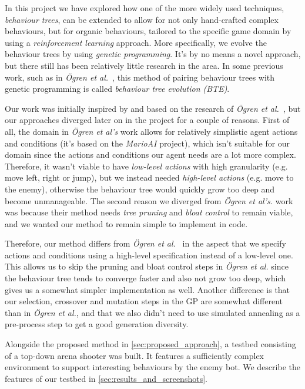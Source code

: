 \documentclass[a4paper, twocolumn]{article}
\begin{document}
    In this project we have explored how one of the more widely used techniques, \emph{behaviour trees}, can be extended to allow for not only hand-crafted complex behaviours, but for organic behaviours, tailored to the specific game domain by using a \emph{reinforcement learning} approach. More specifically, we evolve the behaviour trees by using \emph{genetic programming}. It's by no means a novel approach, but there still has been relatively little research in the area. In some previous work, such as in \emph{Ögren et al.}~\cite{colledanchise2015learning}, this method of pairing behaviour trees with genetic programming is called \emph{behaviour tree evolution (BTE)}.

    Our work was initially inspired by and based on the research of \emph{Ögren et al.}~\cite{colledanchise2015learning}, but our approaches diverged later on in the project for a couple of reasons. First of all, the domain in \emph{Ögren et al's} work allows for relatively simplistic agent actions and conditions (it's based on the \emph{MarioAI} project), which isn't suitable for our domain since the actions and conditions our agent needs are a lot more complex. Therefore, it wasn't viable to have \emph{low-level actions} with high granularity (e.g. move left, right or jump), but we instead needed \emph{high-level actions} (e.g. move to the enemy), otherwise the behaviour tree would quickly grow too deep and become unmanageable. The second reason we diverged from \emph{Ögren et al's.} work was because their method needs \emph{tree pruning} and \emph{bloat control} to remain viable, and we wanted our method to remain simple to implement in code.

    Therefore, our method differs from \emph{Ögren et al.}~\cite{colledanchise2015learning} in the aspect that we specify actions and conditions using a high-level specification instead of a low-level one. This allows us to skip the pruning and bloat control steps in \emph{Ögren et al.} since the behaviour tree tends to converge faster and also not grow too deep, which gives us a somewhat simpler implementation as well. Another difference is that our selection, crossover and mutation steps in the GP are somewhat different than in \emph{Ögren et al.}, and that we also didn't need to use simulated annealing as a pre-process step to get a good generation diversity.

    Alongside the proposed method in \cref{sec:proposed_approach}, a testbed consisting of a top-down arena shooter was built. It features a sufficiently complex environment to support interesting behaviours by the enemy bot. We describe the features of our testbed in \cref{sec:results_and_screenshots}.
\end{document}
